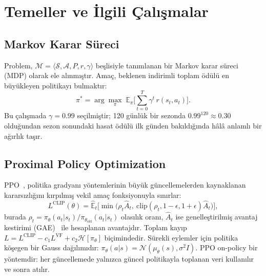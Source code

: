 \documentclass[conference,a4paper]{IEEEtran}
\begin{document}
\section{Temeller ve İlgili Çalışmalar}

\subsection{Markov Karar Süreci}
Problem, $\mathcal{M}=\langle\mathcal{S},\mathcal{A},P,r,\gamma\rangle$ beşlisiyle tanımlanan bir Markov karar süreci (MDP) olarak ele alınmıştır. Amaç, beklenen indirimli toplam ödülü en büyükleyen politikayı bulmaktır:
\begin{equation}
\pi^{*}=\arg\max_{\pi}\;\mathbb{E}_{\pi}\Big[\sum_{t=0}^{T}\gamma^{t}\,r(s_t,a_t)\Big].
\end{equation}
Bu çalışmada $\gamma=0.99$ seçilmiştir; 120 günlük bir sezonda $0.99^{120}\approx0.30$ olduğundan sezon sonundaki hasat ödülü ilk günden bakıldığında hâlâ anlamlı bir ağırlık taşır.

\subsection{Proximal Policy Optimization}
PPO~\cite{schulman2017}, politika gradyanı yöntemlerinin büyük güncellemelerden kaynaklanan kararsızlığını kırpılmış vekil amaç fonksiyonuyla sınırlar:
\begin{equation}
L^{\mathrm{CLIP}}(\theta)=\hat{\mathbb{E}}_t\big[\min\big(\rho_t\hat{A}_t,\ \mathrm{clip}(\rho_t,1-\epsilon,1+\epsilon)\hat{A}_t\big)\big],
\end{equation}
burada $\rho_t=\pi_\theta(a_t|s_t)/\pi_{\theta_{\mathrm{old}}}(a_t|s_t)$ olasılık oranı, $\hat{A}_t$ ise genelleştirilmiş avantaj kestirimi (GAE)~\cite{schulman2016} ile hesaplanan avantajdır. Toplam kayıp $L=L^{\mathrm{CLIP}}-c_1L^{\mathrm{VF}}+c_2\mathcal{H}[\pi_\theta]$ biçimindedir. Sürekli eylemler için politika köşegen bir Gauss dağılımıdır: $\pi_\theta(a|s)=\mathcal{N}(\mu_\theta(s),\sigma^2 I)$. PPO on-policy bir yöntemdir: her güncellemede yalnızca güncel politikayla toplanan veri kullanılır ve sonra atılır.
\end{document}
